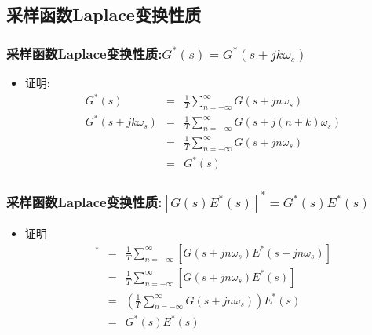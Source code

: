 \documentclass[table]{article}
\begin{document}
\subsection{采样函数Laplace变换性质}
\label{sec-2-2}
\begin{frame}
\frametitle{采样函数Laplace变换性质:$G^*(s)=G^*(s+jk\omega_s)$}
\label{sec-2-2-1}

\begin{itemize}
\item <2-> 证明:
     \begin{eqnarray*}
     G^*(s) &=& \frac{1}{T}\sum_{n=-\infty}^{\infty}G(s+jn\omega_s) \\
     G^*(s+jk\omega_s) &=& \frac{1}{T}\sum_{n=-\infty}^{\infty}G(s+j(n+k)\omega_s) \\
      &=& \frac{1}{T}\sum_{n=-\infty}^{\infty}G(s+jn\omega_s)\\
      &=& G^*(s)
     \end{eqnarray*}
\end{itemize}
\end{frame}
\begin{frame}
\frametitle{采样函数Laplace变换性质:$[G(s)E^*(s)]^*=G^*(s)E^*(s)$}
\label{sec-2-2-2}

\begin{itemize}
\item <2-> 证明
     \begin{eqnarray*}
     [G(s)E^*(s)]^* &= & \frac{1}{T}\sum_{n=-\infty}^{\infty}[G(s+jn\omega_s)E^*(s+jn\omega_s)] \\
      &=& \frac{1}{T}\sum_{n=-\infty}^{\infty}[G(s+jn\omega_s)E^*(s)] \\
      &=& (\frac{1}{T}\sum_{n=-\infty}^{\infty}G(s+jn\omega_s))E^*(s) \\
      &=& G^*(s)E^*(s)
     \end{eqnarray*}
\end{itemize}
\end{frame}
\end{document}
